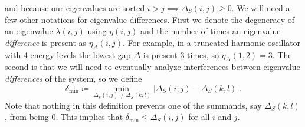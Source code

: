 \documentclass{article}
\begin{document}
and because our eigenvalues are sorted $i > j \implies \Delta_S(i,j) \geq 0$. We will need a few other notations for eigenvalue differences. First we denote the degeneracy of an eigenvalue $\lambda(i,j)$ using $\eta(i,j)$ and the number of times an eigenvalue \emph{difference} is present as $\eta_\Delta(i,j)$. For example, in a truncated harmonic oscillator with 4 energy levels the lowest gap $\Delta$ is present 3 times, so $\eta_\Delta(1, 2) = 3$. The second is that we will need to eventually analyze interferences between eigenvalue \emph{differences} of the system, so we define
\begin{equation}
    \delta_{\min} \coloneqq \min_{\Delta_S(i,j) \neq \Delta_S(k,l)} \left| \Delta_S(i,j) - \Delta_S(k, l) \right|. \label{eq:delta_min_def}
\end{equation}
Note that nothing in this definition prevents one of the summands, say $\Delta_S(k,l)$, from being 0. This implies that $\delta_{\min} \leq \Delta_S(i,j)$ for all $i$ and $j$.
\end{document}
